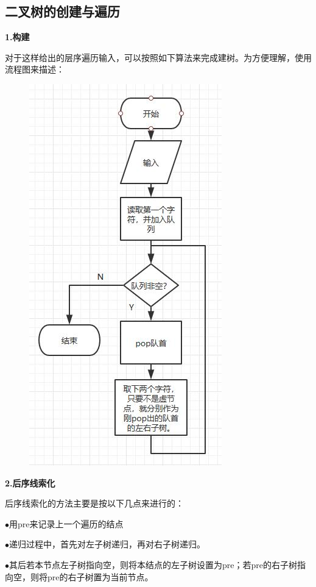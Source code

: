 \documentclass[UTF8]{article}
\begin{document}
	\subsection{二叉树的创建与遍历}
	\textbf{1.构建}\par
	对于这样给出的层序遍历输入，可以按照如下算法来完成建树。为方便理解，使用流程图来描述：\par
	\begin{figure}[H]
		\centering
		\includegraphics[width=0.6\linewidth]{process1.jpg}
		\label{process1}
	\end{figure}\par

	\textbf{2.后序线索化}\par
	后序线索化的方法主要是按以下几点来进行的：\par
	$\bullet$用pre来记录上一个遍历的结点\par
	$\bullet$递归过程中，首先对左子树递归，再对右子树递归。\par
	$\bullet$其后若本节点左子树指向空，则将本结点的左子树设置为pre；若pre的右子树指向空，则将pre的右子树置为当前节点。\par
	
\end{document}
